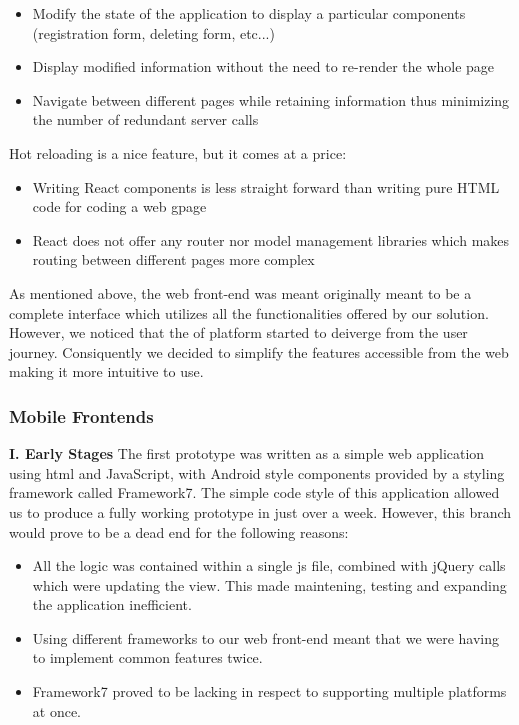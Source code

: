 \begin{itemize}
	\item Modify the state of the application to display a particular components (registration form, deleting form, etc...)
	\item Display modified information without the need to re-render the whole page
	\item Navigate between different pages while retaining information thus minimizing the number of redundant server calls
\end{itemize}

Hot reloading is a nice feature, but it comes at a price:
\begin{itemize}
	\item Writing React components is less straight forward than writing pure HTML code for coding a web gpage
	\item React does not offer any router nor model management libraries which makes routing between different pages more complex
\end{itemize}

As mentioned above, the web front-end was meant originally meant to be a complete interface which utilizes all the functionalities offered by our solution. However, we noticed that the of platform started to deiverge from the user journey. Consiquently we decided to simplify the features accessible from the web making it more intuitive to use.

\subsubsection{Mobile Frontends}

\textbf{I. Early Stages}
The first prototype was written as a simple web application using html and JavaScript, with Android style components provided by a styling framework called Framework7. The simple code style of this application allowed us to produce a fully working prototype in just over a week. However, this branch would prove to be a dead end for the following reasons:
\begin{itemize}
  \item All the logic was contained within a single js file, combined with jQuery calls which were updating the view. This made maintening, testing and expanding the application inefficient.
  \item Using different frameworks to our web front-end meant that we were having to implement common features twice.
  \item Framework7 proved to be lacking in respect to supporting multiple platforms at once.
\end{itemize}

